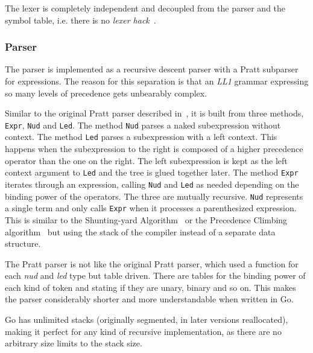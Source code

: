 \documentclass[a4paper]{article}
\begin{document}
The lexer is completely independent and decoupled from the parser and
the symbol table, i.e.  there is no \emph{lexer hack}~\cite{lexhack}.

\subsubsection{Parser}
The parser is implemented as a recursive descent parser with a Pratt
subparser~\cite{pratt} for expressions.  The reason for this separation
is that an \emph{LL1} grammar expressing so many levels of precedence
gets unbearably complex.


Similar to the original Pratt parser described in~\cite{pratt}, it is built from
three methods, \verb+Expr+, \verb+Nud+ and \verb+Led+.  The method
\verb+Nud+ parses a naked subexpression without context.  The method
\verb+Led+ parses a subexpression with a left context. This happens
when the subexpression to the right is composed of a higher precedence
operator than the one on the right. The left subexpression is kept as the
left context argument to \verb+Led+ and the tree is glued together later.
The method \verb+Expr+ iterates
through an expression, calling \verb+Nud+ and \verb+Led+ as needed
depending on the binding power of the operators.  The three are mutually
recursive. \verb+Nud+ represents a single term and only calls \verb+Expr+ when
it processes a parenthesized expression.
This is similar to the Shunting-yard Algorithm~\cite{dijkstra1961algol}
or the Precedence Climbing algorithm~\cite{richards1981bcpl} but using
the stack of the compiler instead of a separate data structure.


The Pratt parser is not like the original Pratt parser, which used a
function for each \emph{nud} and \emph{led} type but table driven. There are
tables for the binding power of each kind of token and stating if they
are unary, binary and so on.
This makes the parser considerably shorter and more understandable
when written in Go.

Go has unlimited stacks (originally segmented, in later versions reallocated),
making it perfect for any kind of recursive implementation,
as there are no arbitrary size limits to the stack size.
\end{document}
